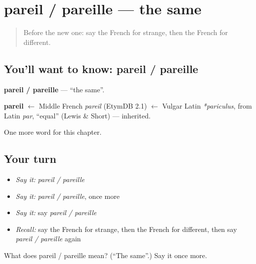 \section[pareil / pareille]{pareil / pareille — the same}

\label{lesson:FR-C219-pareil-pareille}



\begin{quote}
Before the new one: say the French for strange, then the French for different.
\end{quote}

\subsection*{You'll want to know: pareil / pareille}
\textbf{pareil / pareille} — \textquotedblleft{}the same\textquotedblright{}.

\begin{cousinweb}
\textbf{pareil} $\leftarrow$ Middle French \emph{pareil} (EtymDB 2.1) $\leftarrow$ Vulgar Latin \emph{*pariculus}, from Latin \emph{par}, \textquotedblleft{}equal\textquotedblright{} (Lewis \& Short) — inherited.
\end{cousinweb}

\begin{grammarlens}[title={What you've built}]
One more word for this chapter.
\end{grammarlens}

\subsection*{Your turn}
\begin{itemize}
\raggedright
  \item \emph{Say it:} \emph{pareil / pareille}
  \item \emph{Say it:} \emph{pareil / pareille}, once more
  \item \emph{Say it:} say \emph{pareil / pareille}
  \item \emph{Recall:} say the French for strange, then the French for different, then say \emph{pareil / pareille} again
\end{itemize}

\begin{tcolorbox}[breakable,colback=teal!4,colframe=teal!35!black,title={Before you move on}]
What does pareil / pareille mean? (\textquotedblleft{}The same\textquotedblright{}.) Say it once more.
\end{tcolorbox}
